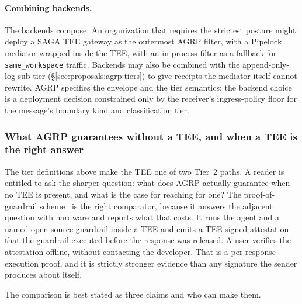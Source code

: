 \paragraph{Combining backends.}
The backends compose. An organization that requires
the strictest posture might deploy a SAGA TEE gateway
as the outermost AGRP filter, with a Pipelock mediator
wrapped inside the TEE, with an in-process filter as
a fallback for \texttt{same\_workspace} traffic.
Backends may also be combined with the append-only-log
sub-tier (\S\ref{sec:proposals:agrp:tiers}) to give
receipts the mediator itself cannot rewrite. AGRP
specifies the envelope and the tier semantics; the
backend choice is a deployment decision constrained
only by the receiver's ingress-policy floor for the
message's boundary kind and classification tier.

\subsubsection{What AGRP guarantees without a TEE, and when
a TEE is the right answer}
\label{sec:proposals:agrp:tee}

The tier definitions above make the TEE one of two Tier~2
paths. A reader is entitled to ask the sharper question:
what does AGRP actually guarantee when no TEE is present,
and what is the case for reaching for one? The
proof-of-guardrail scheme~\cite{proof_of_guardrail} is the
right comparator, because it answers the adjacent question
with hardware and reports what that costs. It runs the agent
and a named open-source guardrail inside a TEE and emits a
TEE-signed attestation that the guardrail executed before
the response was released. A user verifies the attestation
offline, without contacting the developer. That is a
per-response execution proof, and it is strictly stronger
evidence than any signature the sender produces about
itself.

The comparison is best stated as three claims and who can
make them.

